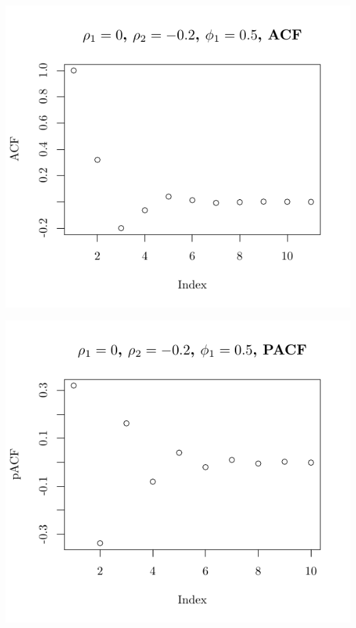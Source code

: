 \documentclass[10pt]{paper}\usepackage[]{graphicx}\usepackage[]{color}
\makeatletter
\def\maxwidth{ %
  \ifdim\Gin@nat@width>\linewidth
    \linewidth
  \else
    \Gin@nat@width
  \fi
}
\newenvironment{knitrout}{}{} %
\makeatother
\begin{document}
\begin{knitrout}
{\centering \includegraphics[width=\maxwidth]{figure/graphics-plotter-51} 

}




{\centering \includegraphics[width=\maxwidth]{figure/graphics-plotter-52} 

}





\end{knitrout}
\end{document}
